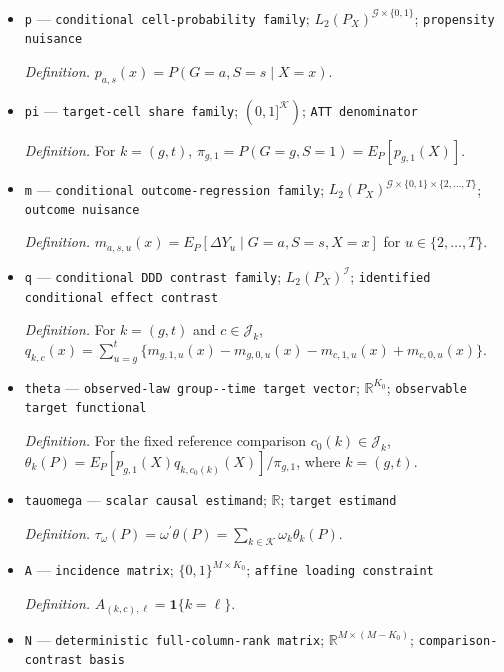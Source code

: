 \documentclass{article}
\begin{document}
\begin{itemize}
  \par\smallskip\noindent\emph{Definition.} For \(u\in\{2,\ldots,T\}\), \(\Delta Y_u=Y_u-Y_{u-1}\).
  \item \texttt{p} --- \texttt{conditional cell-\allowbreak{}probability family}; \(L_2(P_X)^{\mathcal G\times\{0,1\}}\); \texttt{propensity nuisance}
  \par\smallskip\noindent\emph{Definition.} \(p_{a,s}(x)=P(G=a,S=s\mid X=x)\).
  \item \texttt{pi} --- \texttt{target-\allowbreak{}cell share family}; \((0,1]^{\mathcal K})\); \texttt{ATT denominator}
  \par\smallskip\noindent\emph{Definition.} For \(k=(g,t)\), \(\pi_{g,1}=P(G=g,S=1)=E_P[p_{g,1}(X)]\).
  \item \texttt{m} --- \texttt{conditional outcome-\allowbreak{}regression family}; \(L_2(P_X)^{\mathcal G\times\{0,1\}\times\{2,\ldots,T\}}\); \texttt{outcome nuisance}
  \par\smallskip\noindent\emph{Definition.} \(m_{a,s,u}(x)=E_P[\Delta Y_u\mid G=a,S=s,X=x]\) for \(u\in\{2,\ldots,T\}\).
  \item \texttt{q} --- \texttt{conditional DDD contrast family}; \(L_2(P_X)^{\mathcal I}\); \texttt{identified conditional effect contrast}
  \par\smallskip\noindent\emph{Definition.} For \(k=(g,t)\) and \(c\in\mathcal J_k\), \(q_{k,c}(x)=\sum_{u=g}^t\{m_{g,1,u}(x)-m_{g,0,u}(x)-m_{c,1,u}(x)+m_{c,0,u}(x)\}\).
  \item \texttt{theta} --- \texttt{observed-\allowbreak{}law group-\allowbreak{}-\allowbreak{}time target vector}; \(\mathbb R^{K_0}\); \texttt{observable target functional}
  \par\smallskip\noindent\emph{Definition.} For the fixed reference comparison \(c_0(k)\in\mathcal J_k\), \(\theta_k(P)=E_P[p_{g,1}(X)q_{k,c_0(k)}(X)]/\pi_{g,1}\), where \(k=(g,t)\).
  \item \texttt{tauomega} --- \texttt{scalar causal estimand}; \(\mathbb R\); \texttt{target estimand}
  \par\smallskip\noindent\emph{Definition.} \(\tau_{\omega}(P)=\omega^{\prime}\theta(P)=\sum_{k\in\mathcal K}\omega_k\theta_k(P)\).
  \item \texttt{A} --- \texttt{incidence matrix}; \(\{0,1\}^{M\times K_0}\); \texttt{affine loading constraint}
  \par\smallskip\noindent\emph{Definition.} \(A_{(k,c),\ell}=\mathbf 1\{k=\ell\}\).
  \item \texttt{N} --- \texttt{deterministic full-\allowbreak{}column-\allowbreak{}rank matrix}; \(\mathbb R^{M\times(M-K_0)}\); \texttt{comparison-\allowbreak{}contrast basis}

\end{itemize}
\end{document}
